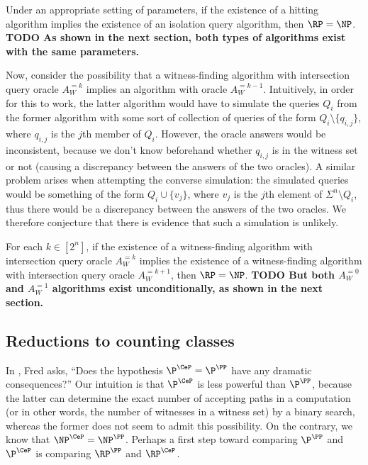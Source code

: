 \documentclass{article}
\newcommand{\todo}[1]{\textbf{TODO #1}}
\begin{document}
\begin{conjecture}
  Under an appropriate setting of parameters, if the existence of a hitting algorithm implies the existence of an isolation query algorithm, then $\RP = \NP$.
  \todo{As shown in the next section, both types of algorithms exist with the same parameters.}
\end{conjecture}

Now, consider the possibility that a witness-finding algorithm with intersection query oracle $A^{= k}_W$ implies an algorithm with oracle $A^{= k - 1}_W$.
Intuitively, in order for this to work, the latter algorithm would have to simulate the queries $Q_i$ from the former algorithm with some sort of collection of queries of the form $Q_i \setminus \{q_{i, j}\}$, where $q_{i, j}$ is the $j$th member of $Q_i$.
However, the oracle answers would be inconsistent, because we don't know beforehand whether $q_{i, j}$ is in the witness set or not (causing a discrepancy between the answers of the two oracles).
A similar problem arises when attempting the converse simulation: the simulated queries would be something of the form $Q_i \cup \{v_j\}$, where $v_j$ is the $j$th element of $\Sigma^n \setminus Q_i$, thus there would be a discrepancy between the answers of the two oracles.
We therefore conjecture that there is evidence that such a simulation is unlikely.

\begin{conjecture}
  For each $k \in \left[2^n\right]$, if the existence of a witness-finding algorithm with intersection query oracle $A^{= k}_W$ implies the existence of a witness-finding algorithm with intersection query oracle $A^{= k + 1}_W$, then $\RP = \NP$.
  \todo{But both $A^{= 0}_W$ and $A^{= 1}_W$ algorithms exist unconditionally, as shown in the next section.}
\end{conjecture}

\subsection{Reductions to counting classes}

In \autocite[Section~7]{green93}, Fred asks, ``Does the hypothesis $\P^{\CeP} = \P^\PP$ have any dramatic consequences?''
Our intuition is that $\P^{\CeP}$ is less powerful than $\P^\PP$, because the latter can determine the exact number of accepting paths in a computation (or in other words, the number of witnesses in a witness set) by a binary search, whereas the former does not seem to admit this possibility.
On the contrary, we know that $\NP^{\CeP} = \NP^\PP$.
Perhaps a first step toward comparing $\P^\PP$ and $\P^{\CeP}$ is comparing $\RP^\PP$ and $\RP^{\CeP}$.
\end{document}
